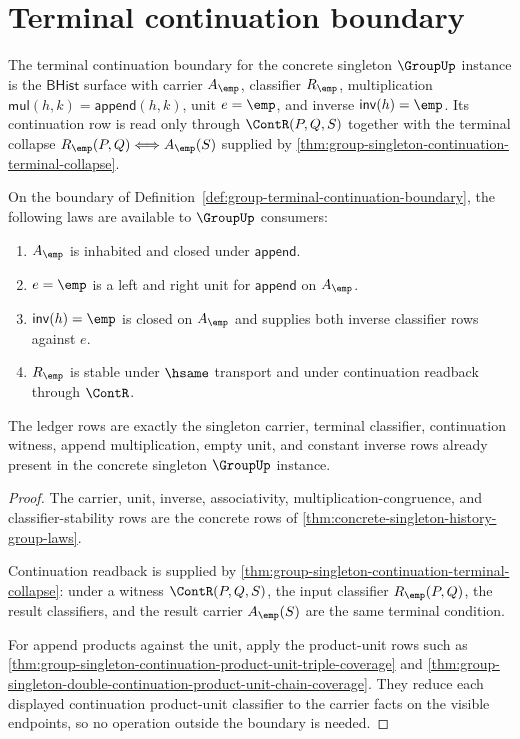 \section{Terminal continuation boundary}
\label{sec:group-terminal-continuation-boundary}

\begin{definition}
\label{def:group-terminal-continuation-boundary}
The terminal continuation boundary for the concrete singleton $\GroupUp$
instance is the $\mathsf{BHist}$ surface with carrier $A_{\emp}$, classifier
$R_{\emp}$, multiplication $\mathsf{mul}(h,k)=\mathsf{append}(h,k)$, unit
$e=\emp$, and inverse $\mathsf{inv}(h)=\emp$. Its continuation row is read
only through $\ContR(P,Q,S)$ together with the terminal collapse
$R_{\emp}(P,Q)\Longleftrightarrow A_{\emp}(S)$ supplied by
\autoref{thm:group-singleton-continuation-terminal-collapse}.
\end{definition}

\begin{theorem}
\label{thm:group-terminal-continuation-boundary-laws}
On the boundary of Definition~\ref{def:group-terminal-continuation-boundary},
the following laws are available to $\GroupUp$ consumers:
\begin{enumerate}
\item $A_{\emp}$ is inhabited and closed under $\mathsf{append}$.
\item $e=\emp$ is a left and right unit for $\mathsf{append}$ on $A_{\emp}$.
\item $\mathsf{inv}(h)=\emp$ is closed on $A_{\emp}$ and supplies both inverse
classifier rows against $e$.
\item $R_{\emp}$ is stable under $\hsame$ transport and under continuation
readback through $\ContR$.
\end{enumerate}
The ledger rows are exactly the singleton carrier, terminal classifier,
continuation witness, append multiplication, empty unit, and constant inverse
rows already present in the concrete singleton $\GroupUp$ instance.
\end{theorem}
\begin{proof}
The carrier, unit, inverse, associativity, multiplication-congruence, and
classifier-stability rows are the concrete rows of
\autoref{thm:concrete-singleton-history-group-laws}.

Continuation readback is supplied by
\autoref{thm:group-singleton-continuation-terminal-collapse}: under a witness
$\ContR(P,Q,S)$, the input classifier $R_{\emp}(P,Q)$, the result classifiers,
and the result carrier $A_{\emp}(S)$ are the same terminal condition.

For append products against the unit, apply the product-unit rows such as
\autoref{thm:group-singleton-continuation-product-unit-triple-coverage} and
\autoref{thm:group-singleton-double-continuation-product-unit-chain-coverage}.
They reduce each displayed continuation product-unit classifier to the carrier
facts on the visible endpoints, so no operation outside the boundary is needed.
\end{proof}

